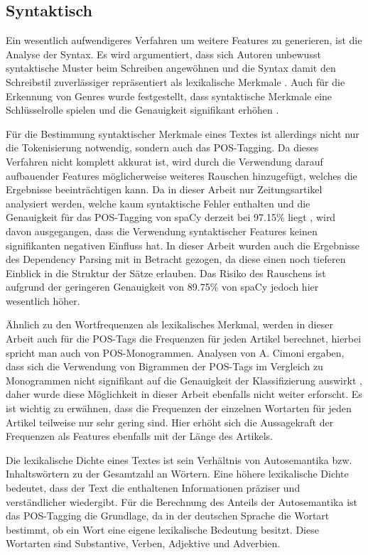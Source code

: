 \subsection{Syntaktisch}
Ein wesentlich aufwendigeres Verfahren um weitere Features zu generieren, ist die Analyse der Syntax. Es wird argumentiert, dass sich Autoren unbewusst syntaktische Muster beim Schreiben angewöhnen und die Syntax damit den Schreibstil zuverlässiger repräsentiert als lexikalische Merkmale \cite[S.~542]{stamatatos2009survey}. Auch für die Erkennung von Genres wurde festgestellt, dass syntaktische Merkmale eine Schlüsselrolle spielen und die Genauigkeit signifikant erhöhen \cite{cimino2017identifying}.

Für die Bestimmung syntaktischer Merkmale eines Textes ist allerdings nicht nur die Tokenisierung notwendig, sondern auch das POS-Tagging. Da dieses Verfahren nicht komplett akkurat ist, wird durch die Verwendung darauf aufbauender Features möglicherweise weiteres Rauschen hinzugefügt, welches die Ergebnisse beeinträchtigen kann. Da in dieser Arbeit nur Zeitungsartikel analysiert werden, welche kaum syntaktische Fehler enthalten und die Genauigkeit für das POS-Tagging von spaCy derzeit bei 97.15\% liegt \cite{spacyAccuracy}, wird davon ausgegangen, dass die Verwendung syntaktischer Features keinen signifikanten negativen Einfluss hat. In dieser Arbeit wurden auch die Ergebnisse des Dependency Parsing mit in Betracht gezogen, da diese einen noch tieferen Einblick in die Struktur der Sätze erlauben. Das Risiko des Rauschens ist aufgrund der geringeren Genauigkeit von 89.75\% von spaCy \cite{spacyAccuracy} jedoch hier wesentlich höher.

Ähnlich zu den Wortfrequenzen als lexikalisches Merkmal, werden in dieser Arbeit auch für die POS-Tags die Frequenzen für jeden Artikel berechnet, hierbei spricht man auch von POS-Monogrammen. Analysen von A. Cimoni ergaben, dass sich die Verwendung von Bigrammen der POS-Tags im Vergleich zu Monogrammen nicht signifikant auf die Genauigkeit der Klassifizierung auswirkt \cite{cimino2017identifying}, daher wurde diese Möglichkeit in dieser Arbeit ebenfalls nicht weiter erforscht. Es ist wichtig zu erwähnen, dass die Frequenzen der einzelnen Wortarten für jeden Artikel teilweise nur sehr gering sind. Hier erhöht sich die Aussagekraft der Frequenzen als Features ebenfalls mit der Länge des Artikels.

Die lexikalische Dichte eines Textes ist sein Verhältnis von Autosemantika bzw. Inhaltswörtern zu der Gesamtzahl an Wörtern. Eine höhere lexikalische Dichte bedeutet, dass der Text die enthaltenen Informationen präziser und verständlicher wiedergibt. Für die Berechnung des Anteils der Autosemantika ist das POS-Tagging die Grundlage, da in der deutschen Sprache die Wortart bestimmt, ob ein Wort eine eigene lexikalische Bedeutung besitzt. Diese Wortarten sind Substantive, Verben, Adjektive und Adverbien.

